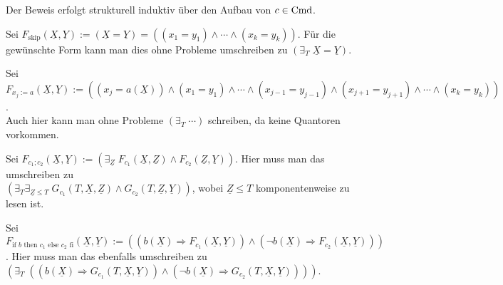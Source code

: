 \begin{Beweis}
    Der Beweis erfolgt strukturell induktiv über den Aufbau von $c \in \text{Cmd}$.

    Sei $F_\text{skip}(\underline{X}, \underline{Y}) := (\underline{X} = \underline{Y}) =
    ((x_1 = y_1) \land \dotsb \land (x_k = y_k))$.
    Für die gewünschte Form kann man dies ohne Probleme umschreiben zu
    $(\exists_T\; \underline{X} = \underline{Y})$.

    Sei $F_{x_j := a}(\underline{X}, \underline{Y}) := ((x_j = a(\underline{X})) \land
    (x_1 = y_1) \land \dotsb \land (x_{j-1} = y_{j-1}) \land (x_{j+1} = y_{j+1}) \land \dotsb \land
    (x_k = y_k))$.\\
    Auch hier kann man ohne Probleme $(\exists_T\; \cdots)$ schreiben, da keine
    Quantoren vorkommen.

    Sei $F_{c_1; c_2}(\underline{X}, \underline{Y}) := (\exists_{\underline{Z}}\;
    F_{c_1}(\underline{X}, \underline{Z}) \land F_{c_2}(\underline{Z}, \underline{Y}))$.
    Hier muss man das umschreiben zu\\
    $(\exists_T \exists_{\underline{Z} \le T}\; G_{c_1}(T, \underline{X}, \underline{Z}) \land
    G_{c_2}(T, \underline{Z}, \underline{Y}))$, wobei $\underline{Z} \le T$ komponentenweise zu
    lesen ist.

    Sei $F_{\text{if } b \text{ then } c_1 \text{ else } c_2 \text{ fi}}(\underline{X},
    \underline{Y}) := ((b(\underline{X}) \Rightarrow F_{c_1}(\underline{X}, \underline{Y})) \land
    (\lnot b(\underline{X}) \Rightarrow F_{c_2}(\underline{X}, \underline{Y})))$.
    Hier muss man das ebenfalls umschreiben zu
    $(\exists_T\; ((b(\underline{X}) \Rightarrow G_{c_1}(T, \underline{X}, \underline{Y})) \land
    (\lnot b(\underline{X}) \Rightarrow G_{c_2}(T, \underline{X}, \underline{Y}))))$.


\end{Beweis}
